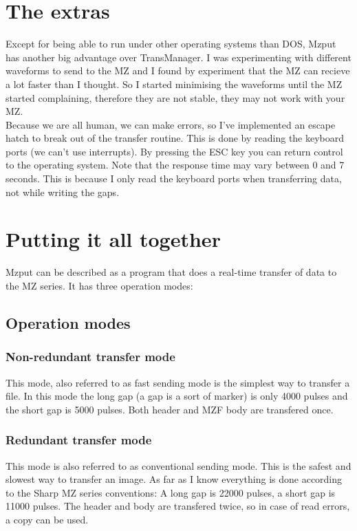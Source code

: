 \section{The extras} \label{xtras}
Except for being able to run under other operating systems than DOS, Mzput has
another big advantage over TransManager. I was experimenting with different
waveforms to send to the MZ and I found by experiment that the MZ can recieve
a lot faster than I thought. So I started minimising the waveforms until the
MZ started complaining, therefore they are not stable, they may not work with
your MZ. \\
Because we are all human, we can make errors, so I've implemented an escape
hatch to break out of the transfer routine. This is done by reading the 
keyboard ports (we can't use interrupts). By pressing the ESC key you can 
return control to the operating system. Note that the response time may vary
between 0 and 7 seconds. This is because I only read the keyboard ports when
transferring data, not while writing the gaps.

\section{Putting it all together}
Mzput can be described as a program that does a real-time transfer of data
to the MZ series. It has three operation modes:

\subsection{Operation modes}
\subsubsection{Non-redundant transfer mode}
This mode, also referred to as fast sending mode is the simplest way to transfer
a file. In this mode the long gap (a gap is a sort of marker) is only 4000
pulses and the short gap is 5000 pulses. Both header and MZF body are
transfered once.

\subsubsection{Redundant transfer mode}
This mode is also referred to as conventional sending mode. This is the safest
and slowest way to transfer an image. As far as I know everything is done 
according to the Sharp MZ series conventions: A long gap is 22000 pulses,
a short gap is 11000 pulses. The header and body are transfered twice, so in
case of read errors, a copy can be used.

